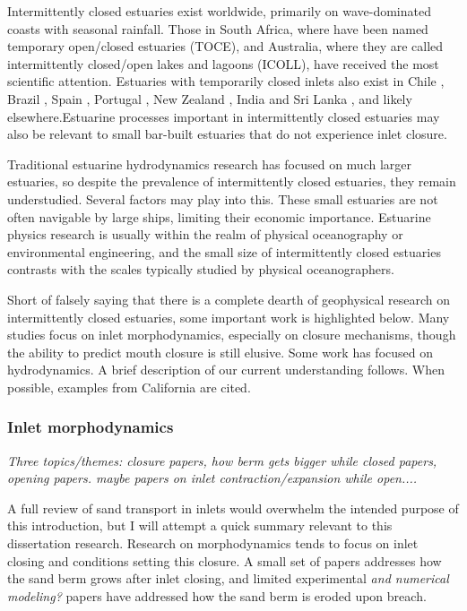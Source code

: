 Intermittently closed estuaries exist worldwide, primarily on wave-dominated coasts with seasonal rainfall. Those in South Africa, where have been named temporary open/closed estuaries (TOCE), and Australia, where they are called intermittently closed/open lakes and lagoons (ICOLL), have received the most scientific attention. Estuaries with temporarily closed inlets also exist in Chile \parencite{dussaillant_water_2009}, Brazil \parencite{suzuki_effects_1998}, Spain \parencite{moreno_morphodynamics_2010}, Portugal \parencite{fortunato_morphological_2014}, New Zealand \parencite{schallenberg_contrasting_2010}, India and Sri Lanka \parencite{ranasinghe_seasonal_2003}, and likely elsewhere.Estuarine processes important in intermittently closed estuaries may also be relevant to small bar-built estuaries that do not experience inlet closure. 

Traditional estuarine hydrodynamics research has focused on much larger estuaries, so despite the prevalence of intermittently closed estuaries, they remain understudied.  Several factors may play into this. These small estuaries are not often navigable by large ships, limiting their economic importance. Estuarine physics research is usually within the realm of physical oceanography or environmental engineering, and the small size of intermittently closed estuaries contrasts with the scales typically studied by physical oceanographers.

Short of falsely saying that there is a complete dearth of geophysical research on intermittently closed estuaries, some important work is highlighted below. Many studies focus on inlet morphodynamics, especially on closure mechanisms, though the ability to predict mouth closure is still elusive. Some work has focused on hydrodynamics. A brief description of our current understanding follows. When possible, examples from California are cited.

\subsubsection{Inlet morphodynamics}
\emph{Three topics/themes: closure papers, how berm gets bigger while closed papers, opening papers. maybe papers on inlet contraction/expansion while open....}


A full review of sand transport in inlets would overwhelm the intended purpose of this introduction, but I will attempt a quick summary relevant to this dissertation research. Research on morphodynamics tends to focus on inlet closing and conditions setting this closure. A small set of papers addresses how the sand berm grows after inlet closing, and limited experimental \emph{and numerical modeling?} papers have addressed how the sand berm is eroded upon breach.

